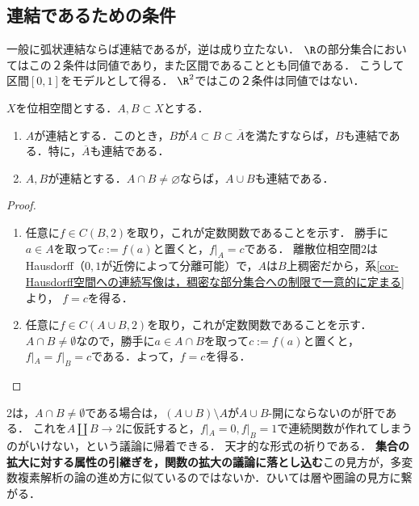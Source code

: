 \documentclass[uplatex,dvipdfmx]{jsreport}
\begin{document}
\subsection{連結であるための条件}

\begin{tcolorbox}[colframe=ForestGreen, colback=ForestGreen!10!white, breakable ,colbacktitle=ForestGreen!40!white, coltitle=black,fonttitle=\bfseries\sffamily
    ,title=連結性]
    一般に弧状連結ならば連結であるが，逆は成り立たない．
    $\R$の部分集合においてはこの２条件は同値であり，また区間であることとも同値である．
    こうして区間$[0,1]$をモデルとして得る．
    $\R^2$ではこの２条件は同値ではない．
\end{tcolorbox}

\begin{corollary}[連結性の伝播]\label{cor-connectedness-over-union}
    $X$を位相空間とする．$A,B\subset X$とする．
    \begin{enumerate}
        \item $A$が連結とする．このとき，$B$が$A\subset B\subset\overline{A}$を満たすならば，$B$も連結である．特に，$\overline{A}$も連結である．
        \item $A,B$が連結とする．$A\cap B\ne\varnothing$ならば，$A\cup B$も連結である．
    \end{enumerate}
\end{corollary}
\begin{proof}\mbox{}
    \begin{enumerate}
        \item 任意に$f\in C(B,2)$を取り，これが定数関数であることを示す．
        勝手に$a\in A$を取って$c:=f(a)$と置くと，$f|_A=c$である．
        離散位相空間$2$はHausdorff（$0,1$が近傍によって分離可能）で，$A$は$B$上稠密だから，系\ref{cor-Hausdorff空間への連続写像は，稠密な部分集合への制限で一意的に定まる}より，
        $f=c$を得る．
        \item 任意に$f\in C(A\cup B,2)$を取り，これが定数関数であることを示す．
        $A\cap B\ne\emptyset$なので，勝手に$a\in A\cap B$を取って$c:=f(a)$と置くと，$f|_A=f|_B=c$である．よって，$f=c$を得る．
    \end{enumerate}
\end{proof}
\begin{remarks}
    2は，$A\cap B\ne\emptyset$である場合は，$(A\cup B)\setminus A$が$A\cup B$-開にならないのが肝である．
    これを$A\coprod B\to 2$に仮託すると，$f|_A=0,f|_B=1$で連続関数が作れてしまうのがいけない，という議論に帰着できる．
    天才的な形式の祈りである．
    \textbf{集合の拡大に対する属性の引継ぎを，関数の拡大の議論に落とし込む}この見方が，多変数複素解析の論の進め方に似ているのではないか．ひいては層や圏論の見方に繋がる．
\end{remarks}
\end{document}
